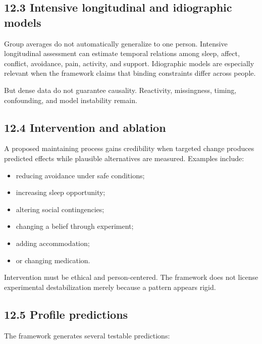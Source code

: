 \documentclass[
  11pt,
]{article}
\providecommand{\tightlist}{%
  \setlength{\itemsep}{0pt}\setlength{\parskip}{0pt}}
\begin{document}
\subsection{12.3 Intensive longitudinal and idiographic
models}\label{intensive-longitudinal-and-idiographic-models}

Group averages do not automatically generalize to one person. Intensive
longitudinal assessment can estimate temporal relations among sleep,
affect, conflict, avoidance, pain, activity, and support. Idiographic
models are especially relevant when the framework claims that binding
constraints differ across people.

But dense data do not guarantee causality. Reactivity, missingness,
timing, confounding, and model instability remain.

\subsection{12.4 Intervention and
ablation}\label{intervention-and-ablation}

A proposed maintaining process gains credibility when targeted change
produces predicted effects while plausible alternatives are measured.
Examples include:

\begin{itemize}
\tightlist
\item
  reducing avoidance under safe conditions;
\item
  increasing sleep opportunity;
\item
  altering social contingencies;
\item
  changing a belief through experiment;
\item
  adding accommodation;
\item
  or changing medication.
\end{itemize}

Intervention must be ethical and person-centered. The framework does not
license experimental destabilization merely because a pattern appears
rigid.

\subsection{12.5 Profile predictions}\label{profile-predictions}

The framework generates several testable predictions:
\end{document}
